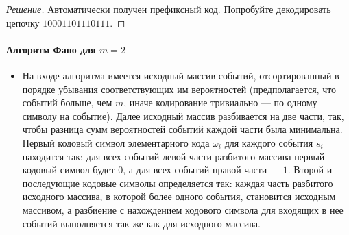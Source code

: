 \begin{proof}[Решение]
    Автоматически получен префиксный код. Попробуйте декодировать цепочку $10001101110111$.
\end{proof}

\paragraph{Алгоритм Фано для $m=2$}
\begin{itemize}
    \item[] На входе алгоритма имеется исходный массив событий, отсортированный в порядке убывания соответствующих им вероятностей (предполагается, что событий больше, чем $m$, иначе кодирование тривиально --- по одному символу на событие). Далее исходный массив разбивается на две части, так, чтобы разница сумм вероятностей событий каждой части была минимальна. Первый кодовый символ элементарного кода $\omega_i$ для каждого события $s_i$ находится так: для всех событий левой части разбитого массива первый кодовый символ будет $0$, а для всех событий правой части --- $1$. Второй и последующие кодовые символы определяется так: каждая часть разбитого исходного массива, в которой более одного события, становится исходным массивом, а разбиение с нахождением кодового символа для входящих в нее событий выполняется так же как для исходного массива.
\end{itemize}

